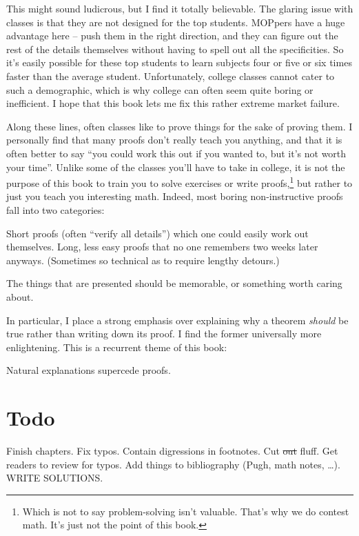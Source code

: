 This might sound ludicrous, but I find it totally believable.
The glaring issue with classes is that they are not designed for the top students.
MOPpers have a huge advantage here -- push them in the right direction,
and they can figure out the rest of the details themselves
without having to spell out all the specificities.
So it's easily possible for these top students to learn subjects
four or five or six times faster than the average student.
Unfortunately, college classes cannot cater to such a demographic,
which is why college can often seem quite boring or inefficient.
I hope that this book lets me fix this rather extreme market failure.

Along these lines, often classes like to prove things for the sake of proving them.
I personally find that many proofs don't really teach you anything,
and that it is often better to say ``you could work this out if you wanted to, but it's not worth your time''.
Unlike some of the classes you'll have to take in college,
it is not the purpose of this book to train you to solve exercises or write proofs,\footnote{%
	Which is not to say problem-solving isn't valuable.
	That's why we do contest math.
	It's just not the point of this book.}
but rather to just you teach you interesting math.
Indeed, most boring non-instructive proofs fall into two categories:
\begin{enumerate}[(i)]
	\ii Short proofs (often ``verify all details'') which one could easily work out themselves.
	\ii Long, less easy proofs that no one remembers two weeks later anyways.
	(Sometimes so technical as to require lengthy detours.)
\end{enumerate}
The things that are presented should be memorable, or something worth caring about.

In particular, I place a strong emphasis over explaining why a theorem \emph{should}
be true rather than writing down its proof.
I find the former universally more enlightening.
This is a recurrent theme of this book:
\begin{moral}
Natural explanations supercede proofs.
\end{moral}

\section*{Todo}
Finish chapters.
Fix typos.
Contain digressions in footnotes.
Cut \sout{out} fluff.
Get readers to review for typos.
Add things to bibliography (Pugh, math notes, \dots).
WRITE SOLUTIONS.

